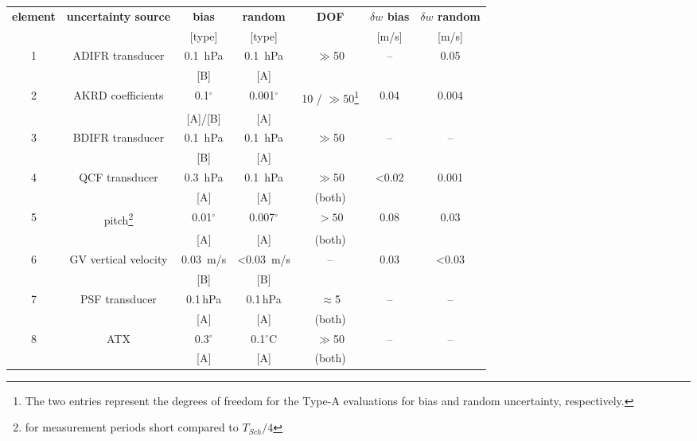 \documentclass[english,british,amtd,bookmarks=false,unicode=true]{copernicus}\usepackage[]{graphicx}\usepackage[]{color}
\providecommand{\tabularnewline}{\\}
\begin{document}
\begin{table*}
\centering{}%
\begin{minipage}[t]{1\columnwidth}%
\begin{center}
\begin{tabular}{ccccccc}
\toprule 
\textbf{element}  &
\textbf{uncertainty source}  &
\textbf{bias}  &
\textbf{random}  &
\textbf{DOF}  &
\textbf{$\delta w$ bias}  &
\textbf{$\delta w$ random }\tabularnewline
 &
 &
{[}type{]}  &
{[}type{]}  &
 &
{[}m/s{]}  &
{[}m/s{]} \tabularnewline
\midrule
\midrule 
1  &
ADIFR transducer  &
0.1~hPa  &
0.1~hPa  &
$\gg$50  &
--  &
0.05\tabularnewline
 &
 &
{[}B{]}  &
{[}A{]} &
 &
 &
\tabularnewline
\midrule 
2  &
AKRD coefficients  &
0.1$^{\circ}$  &
0.001$^{\circ}$  &
10 / $\gg$50\footnote{The two entries represent the degrees of freedom for the Type-A evaluations
for bias and random uncertainty, respectively.} &
0.04  &
0.004\tabularnewline
 &
 &
{[}A{]}/{[}B{]} &
{[}A{]} &
 &
 &
\tabularnewline
\midrule 
3  &
BDIFR transducer  &
0.1~hPa  &
0.1~hPa  &
$\gg$50  &
--  &
--\tabularnewline
 &
 &
{[}B{]}  &
{[}A{]} &
 &
 &
\tabularnewline
\midrule 
4  &
QCF transducer  &
0.3~hPa  &
0.1~hPa  &
$\gg$50  &
<0.02  &
0.001\tabularnewline
 &
 &
{[}A{]} &
{[}A{]} &
(both) &
 &
\tabularnewline
\midrule 
5  &
pitch\footnote{for measurement periods short compared to $T_{Sch}/4$}  &
0.01$^{\circ}$  &
0.007$^{\circ}$  &
$>50$ &
0.08  &
0.03\tabularnewline
 &
 &
{[}A{]} &
{[}A{]} &
(both) &
 &
\tabularnewline
\midrule 
6  &
GV vertical velocity  &
0.03~m/s  &
<0.03~m/s  &
-- &
0.03  &
<0.03\tabularnewline
 &
 &
{[}B{]} &
{[}B{]} &
 &
 &
\tabularnewline
\midrule 
7  &
PSF transducer  &
0.1\,hPa  &
0.1\,hPa  &
$\approx$5 &
--  &
--\tabularnewline
 &
 &
{[}A{]} &
{[}A{]} &
(both) &
 &
\tabularnewline
\midrule 
8  &
ATX  &
0.3$^{\circ}$  &
0.1$^{\circ}$C  &
$\gg$50 &
--  &
--\tabularnewline
 &
 &
{[}A{]} &
{[}A{]} &
(both) &
 &
\tabularnewline
\bottomrule
\end{tabular}
\par\end{center}%
\end{minipage}
\end{table*}
\end{document}
